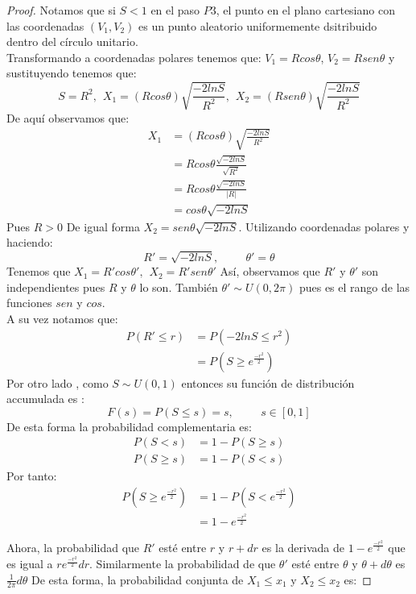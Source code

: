 \begin{proof}
Notamos que si $S < 1 $ en el paso $P3$, el punto en el plano cartesiano con las coordenadas $(V_1,V_2)$ es un punto aleatorio uniformemente dsitribuido dentro del círculo unitario.
\\Transformando a coordenadas polares tenemos que:
$V_1 = Rcos\theta$, $V_2 = Rsen\theta$ y sustituyendo tenemos que:
\[
S = R^2, \hspace{5pt} X_1=(Rcos\theta) \sqrt{\frac{-2lnS}{R^2}}, \hspace{5pt} X_2=(Rsen\theta) \sqrt{\frac{-2lnS}{R^2}}
\]
De aquí observamos que:
\begin{align*} 
X_1 &= (Rcos\theta) \sqrt{\frac{-2lnS}{R^2}} \\ 
 &=  Rcos\theta \frac{\sqrt{-2lnS}}{\sqrt{R^2}}\\
 &= Rcos\theta \frac{\sqrt{-2lnS}}{|R|} \\
&= cos\theta \sqrt{-2lnS}
\end{align*}
Pues $R >0$
De igual forma $X_2 = sen\theta\sqrt{-2lnS}$.
Utilizando coordenadas polares y haciendo: 
\[
R' = \sqrt{-2lnS}, \hspace{1cm}\theta' = \theta
\]
Tenemos que $X_1 = R'cos\theta', \hspace{5pt} X_2 = R'sen\theta'$
Así, observamos que $R'$ y $\theta'$ son independientes pues $R$ y $\theta$ lo son.
También $\theta' \sim U(0,2\pi)$ pues es el rango de las funciones $sen$ y $cos$. 
\\A su vez notamos que:
\begin{align*}
P(R' \leq r) &=P(-2lnS \leq r^2)\\
&= P(S \geq e^{\frac{-r^2}{2}})
\end{align*}
Por otro lado , como $S \sim U(0,1)$ entonces su función de distribución accumulada es :
\[
F(s) = P(S\leq s) = s, \hspace{1cm} s \in[0,1]
\]
De esta forma la probabilidad complementaria es:
\begin{align*}
P(S < s) &= 1 - P(S \geq s)\\
P(S \geq s) &= 1 - P(S<s)
\end{align*}
Por tanto:
\begin{align*}
P(S\geq e^{\frac{-r^2}{2}} ) &= 1 -P(S < e^{\frac{-r^2}{2}})\\
&= 1 - e^{\frac{-r^2}{2}}  
\end{align*}

Ahora, la probabilidad que $R'$ esté entre $r$ y $r +dr$ es la derivada de $1-e^{\frac{-r^2}{2}}$ que es igual a $re^{\frac{-r^2}{2}}dr$. Similarmente la probabilidad de que $\theta'$ esté entre $\theta$ y $\theta + d\theta$ es $\frac{1}{2\pi}d\theta$
De esta forma, la probabilidad conjunta de $X_1 \leq x_1$ y $X_2 \leq x_2$ es:


\end{proof}
